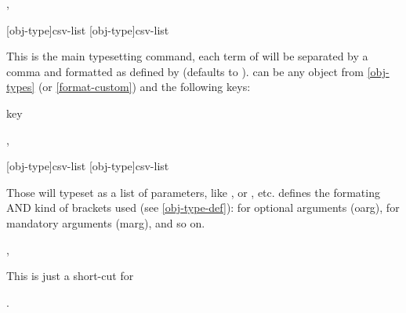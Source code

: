 \documentclass{article}
\begin{document}
\begin{codedescribe}[code,update=2025/05/29]{\typesetobj,\tsobj}
\begin{codesyntax}
\tsmacro{\typesetobj}[obj-type]{csv-list}
\tsmacro{\tsobj}[obj-type]{csv-list}
\end{codesyntax}
This is the main typesetting command, each term of  will be separated by a comma and formatted as defined by  (defaults to ).  can be any object from \ref{obj-types} (or \ref{format-custom}) and the following keys:
\begin{describelist*}{key}
\end{describelist*}
\end{codedescribe}

%

\begin{codedescribe}[code]{\typesetargs,\tsargs}
\begin{codesyntax}
\tsmacro{\typesetargs}[obj-type]{csv-list}
\tsmacro{\tsargs}[obj-type]{csv-list}
\end{codesyntax}
 Those will typeset  as a list of parameters, like , or , etc.  defines the formating AND kind of brackets used (see \ref{obj-type-def}): \tsverb{[]} for optional arguments (oarg), \tsverb{{}} for mandatory arguments (marg), and so on.
\end{codedescribe}


\begin{codedescribe}[code]{\typesetmacro,\tsmacro}
\begin{codesyntax}
\end{codesyntax}
This is just a short-cut for\par {}  .
\end{codedescribe}
\end{document}
